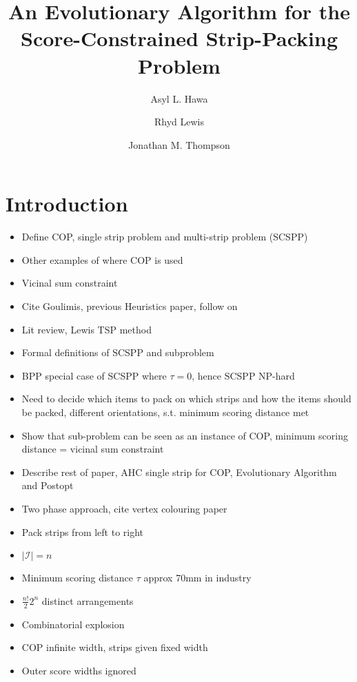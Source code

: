 \documentclass{elsarticle}
\begin{document}
	
\begin{frontmatter}
\title{An Evolutionary Algorithm for the Score-Constrained Strip-Packing Problem}
\author{Asyl L. Hawa}
\author{Rhyd Lewis}
\author{Jonathan M. Thompson}
\address{School of Mathematics, Cardiff University, Senghennydd Road, Cardiff, UK}
\end{frontmatter}


\section{Introduction}
\begin{itemize}
	\item Define COP, single strip problem and multi-strip problem (SCSPP)
	\item Other examples of where COP is used
	\item Vicinal sum constraint
	\item Cite Goulimis, previous Heuristics paper, follow on
	\item Lit review, Lewis TSP method
	\item Formal definitions of SCSPP and subproblem
	\item BPP special case of SCSPP where $\tau = 0$, hence SCSPP NP-hard
	\item Need to decide which items to pack on which strips and how the items should be packed, different orientations, s.t. minimum scoring distance met
	\item Show that sub-problem can be seen as an instance of COP, minimum scoring distance = vicinal sum constraint
	\item Describe rest of paper, AHC single strip for COP, Evolutionary Algorithm and Postopt
	\item Two phase approach, cite vertex colouring paper
	\item Pack strips from left to right
	\item $|\mathcal{I}| = n$
	\item Minimum scoring distance $\tau$ approx 70mm in industry
	\item $\frac{n!}{2} 2^n$ distinct arrangements
	\item Combinatorial explosion
	\item COP infinite width, strips given fixed width
	\item Outer score widths ignored
\end{itemize}
\end{document}
